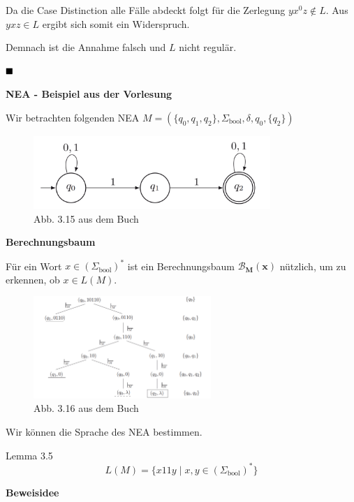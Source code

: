 \documentclass[a4paper, 11pt]{article}
\newcommand\myTitle[1]{{\large \textbf {#1}}}
\begin{document}
        Da die Case Distinction alle Fälle abdeckt folgt für die Zerlegung $yx^0z \notin L$. Aus $yxz \in L$ ergibt sich somit ein Widerspruch. 
    
        Demnach ist die Annahme falsch und $L$ nicht regulär.
    
        $\hfill\blacksquare$
    
    
        \myTitle{NEA - Beispiel aus der Vorlesung}
        
        Wir betrachten folgenden NEA $M = (\{q_0,q_1,q_2\}, \Sigma_{\text{bool}}, \delta, q_0, \{q_2\})$
        \begin{figure}
            \centering
            \includegraphics[width=0.8\textwidth]{Beispiel_NEA.png}
            \caption[]{Abb. 3.15 aus dem Buch}
        \end{figure}
    
        \myTitle{Berechnungsbaum}

        Für ein Wort $x \in (\Sigma_{\text{bool}})^*$ ist ein Berechnungsbaum $\mathbf{\mathcal{B}_M(x)}$ nützlich, um zu erkennen, ob  $x \in L(M)$.
    
        \begin{figure}[htp]
            \centering
            \includegraphics[width=0.6\textwidth]{Berechnungsbaum.png}
            \caption{Abb. 3.16 aus dem Buch}
        \end{figure}
    
        Wir können die Sprache des NEA bestimmen.
        \begin{subbox}{Lemma 3.5}
            $$L(M) = \{x11y \mid x,y \in (\Sigma_{\text{bool}})^*\}$$
        \end{subbox}
        \textbf{Beweisidee}
    
\end{document}
